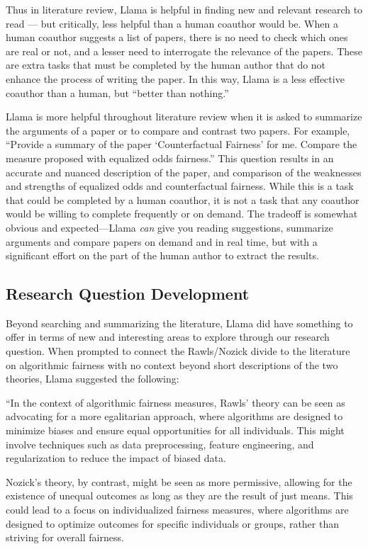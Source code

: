Thus in literature review, Llama is helpful in finding new and relevant research
to read — but critically, less helpful than a human coauthor would be. When a
human coauthor suggests a list of papers, there is no need to check which ones
are real or not, and a lesser need to interrogate the relevance of the papers.
These are extra tasks that must be completed by the human author that do not
enhance the process of writing the paper. In this way, Llama is a less effective
coauthor than a human, but ``better than nothing.''

Llama is more helpful throughout literature review when it is asked to summarize
the arguments of a paper or to compare and contrast two papers. For example,
``Provide a summary of the paper `Counterfactual Fairness' for me. Compare the
measure proposed with equalized odds fairness.'' This question results in an
accurate and nuanced description of the paper, and comparison of the weaknesses
and strengths of equalized odds and counterfactual fairness. While this is a 
task that could be completed by a human coauthor, it is not a task that any 
coauthor would be willing to complete frequently or on demand. The tradeoff is 
somewhat obvious and expected—Llama \emph{can} give you reading suggestions,
summarize arguments and compare papers on demand and in real time, but with 
a significant effort on the part of the human author to extract the results.

\subsection{Research Question Development}

Beyond searching and summarizing the literature, Llama did have something to
offer in terms of new and interesting areas to explore through our research
question. When prompted to connect the Rawls/Nozick divide to the literature on
algorithmic fairness with no context beyond short descriptions of the two 
theories, Llama suggested the following:

``In the context of algorithmic fairness measures, Rawls' theory can be seen as
advocating for a more egalitarian approach, where algorithms are designed to
minimize biases and ensure equal opportunities for all individuals. This might
involve techniques such as data preprocessing, feature engineering, and
regularization to reduce the impact of biased data.

Nozick's theory, by contrast, might be seen as more permissive, allowing for the
existence of unequal outcomes as long as they are the result of just means. This
could lead to a focus on individualized fairness measures, where algorithms are
designed to optimize outcomes for specific individuals or groups, rather than
striving for overall fairness.

